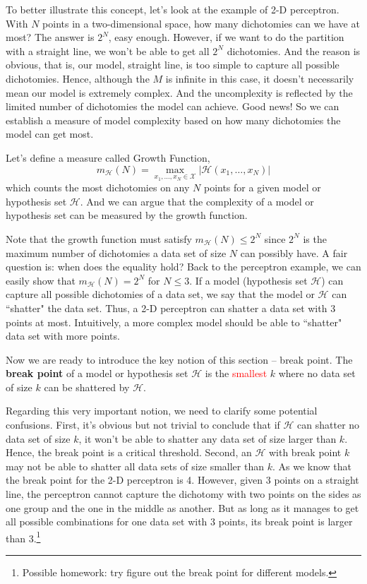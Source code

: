 \documentclass[10pt]{article}
\numberwithin{equation}{section}  %
\begin{document}
To better illustrate this concept, let's look at the example of 2-D perceptron. With $N$ points in a two-dimensional space, how many dichotomies can we have at most? The answer is $2^N$, easy enough. However, if we want to do the partition with a straight line, we won't be able to get all $2^N$ dichotomies. And the reason is obvious, that is, our model, straight line, is too simple to capture all possible dichotomies. Hence, although the $M$ is infinite in this case, it doesn't necessarily mean our model is extremely complex. And the uncomplexity is reflected by the limited number of dichotomies the model can achieve. Good news! So we can establish a measure of model complexity based on how many dichotomies the model can get most.

Let's define a measure called Growth Function,
\begin{equation}
    m_\mathcal{H}(N) = \max_{x_1, \dots, x_N \in \mathcal{X}} \vert \mathcal{H}(x_1, \dots, x_N)\vert
\end{equation}
which counts the most dichotomies on any $N$ points for a given model or hypothesis set $\mathcal{H}$. And we can argue that the complexity of a model or hypothesis set can be measured by the growth function.

Note that the growth function must satisfy $m_\mathcal{H}(N) \leq 2^N$ since $2^N$ is the maximum number of dichotomies a data set of size $N$ can possibly have. A fair question is: when does the equality hold? Back to the perceptron example, we can easily show that $m_\mathcal{H}(N) = 2^N$ for $N \leq 3$. If a model (hypothesis set $\mathcal{H}$) can capture all possible dichotomies of a data set, we say that the model or $\mathcal{H}$ can ``shatter" the data set. Thus, a 2-D perceptron can shatter a data set with 3 points at most. Intuitively, a more complex model should be able to ``shatter" data set with more points.

Now we are ready to introduce the key notion of this section -- break point. The \textbf{break point} of a model or hypothesis set $\mathcal{H}$ is the \textcolor{red}{smallest} $k$ where no data set of size $k$ can be shattered by $\mathcal{H}$.

Regarding this very important notion, we need to clarify some potential confusions. First, it's obvious but not trivial to conclude that if $\mathcal{H}$ can shatter no data set of size $k$, it won't be able to shatter any data set of size larger than $k$. Hence, the break point is a critical threshold. Second, an $\mathcal{H}$ with break point $k$ may not be able to shatter all data sets of size smaller than $k$. As we know that the break point for the 2-D perceptron is 4. However, given 3 points on a straight line, the perceptron cannot capture the dichotomy with two points on the sides as one group and the one in the middle as another. But as long as it manages to get all possible combinations for one data set with 3 points, its break point is larger than 3.\footnote{Possible homework: try figure out the break point for different models.}
\end{document}
